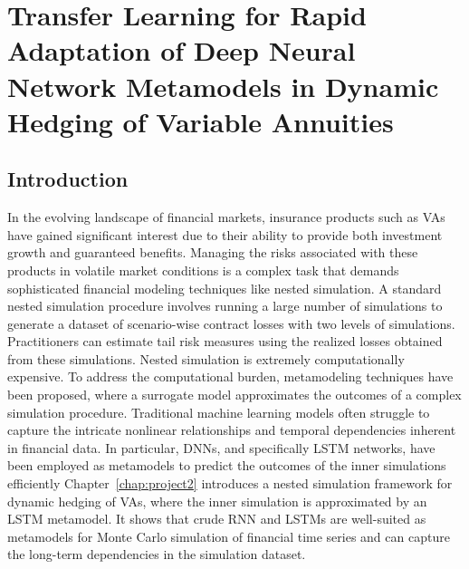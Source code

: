 \chapter{Transfer Learning for Rapid Adaptation of Deep Neural Network Metamodels in Dynamic Hedging of Variable Annuities} \label{chap:project3}

\section{Introduction}

In the evolving landscape of financial markets, insurance products such as VAs have gained significant interest due to their ability to provide both investment growth and guaranteed benefits. 
Managing the risks associated with these products in volatile market conditions is a complex task that demands sophisticated financial modeling techniques like nested simulation.
A standard nested simulation procedure involves running a large number of simulations to generate a dataset of scenario-wise contract losses with two levels of simulations.
Practitioners can estimate tail risk measures using the realized losses obtained from these simulations.
Nested simulation is extremely computationally expensive.
To address the computational burden, metamodeling techniques have been proposed, where a surrogate model approximates the outcomes of a complex simulation procedure. 
Traditional machine learning models often struggle to capture the intricate nonlinear relationships and temporal dependencies inherent in financial data.
In particular, DNNs, and specifically LSTM networks, have been employed as metamodels to predict the outcomes of the inner simulations efficiently
Chapter~\ref{chap:project2} introduces a nested simulation framework for dynamic hedging of VAs, where the inner simulation is approximated by an LSTM metamodel.
It shows that crude RNN and LSTMs are well-suited as metamodels for Monte Carlo simulation of financial time series and can capture the long-term dependencies in the simulation dataset.

